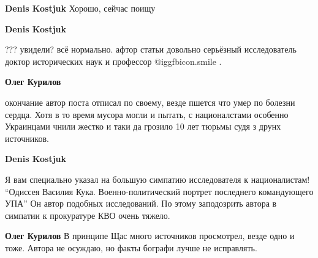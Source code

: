 \begin{itemize}
\begin{itemize}
\begin{itemize}
\textbf{Denis Kostjuk} Хорошо, сейчас поищу

\textbf{Denis Kostjuk} 

??? увидели? всё нормально. афтор статьи довольно серьёзный исследователь
доктор исторических наук и профессор  @igg{fbicon.smile} .

\textbf{Олег Курилов} 

окончание автор поста отписал по своему, везде пшется что умер по болезни
сердца. Хотя в то время мусора могли и пытать, с националстами особенно
Украинцами чнили жестко и таки да грозило 10 лет тюрьмы судя з друнх
источников.

\textbf{Denis Kostjuk} 

Я вам специально указал на большую симпатию исследователя к националистам!
\enquote{Одиссея Василия Кука. Военно-политический портрет последнего командующего УПА}
Он автор подобных исследований. По этому заподозрить автора в симпатии к
прокуратуре КВО очень тяжело.

\textbf{Олег Курилов} В принципе Щас много источников просмотрел, везде одно и тоже. Автора не осуждаю, но факты бографи лучше не исправлять.
\end{itemize} %

\end{itemize} %

\end{itemize} %
